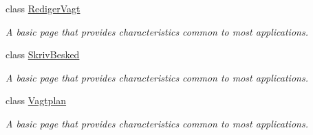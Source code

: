 \begin{DoxyCompactItemize}
class \hyperlink{class__1aarsproeve_1_1_view_1_1_rediger_vagt}{Rediger\+Vagt}
\begin{DoxyCompactList}\small\item\em A basic page that provides characteristics common to most applications. \end{DoxyCompactList}\item 
class \hyperlink{class__1aarsproeve_1_1_view_1_1_skriv_besked}{Skriv\+Besked}
\begin{DoxyCompactList}\small\item\em A basic page that provides characteristics common to most applications. \end{DoxyCompactList}\item 
class \hyperlink{class__1aarsproeve_1_1_view_1_1_vagtplan}{Vagtplan}
\begin{DoxyCompactList}\small\item\em A basic page that provides characteristics common to most applications. \end{DoxyCompactList}\end{DoxyCompactItemize}
